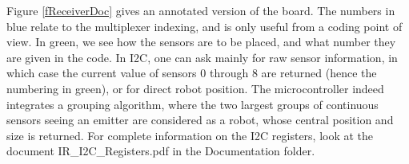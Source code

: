 \documentclass[a4paper,11pt]{article}
\begin{document}
Figure \ref{fReceiverDoc} gives an annotated version of the board. The numbers in blue relate to the multiplexer indexing, and is only useful from a coding point of view. In green, we see how the sensors are to be placed, and what number they are given in the code. In I2C, one can ask mainly for raw sensor information, in which case the current value of sensors 0 through 8 are returned (hence the numbering in green), or for direct robot position. The microcontroller indeed integrates a grouping algorithm, where the two largest groups of continuous sensors seeing an emitter are considered as a robot, whose central position and size is returned. For complete information on the I2C registers, look at the document IR\_I2C\_Registers.pdf in the Documentation folder.
\end{document}
